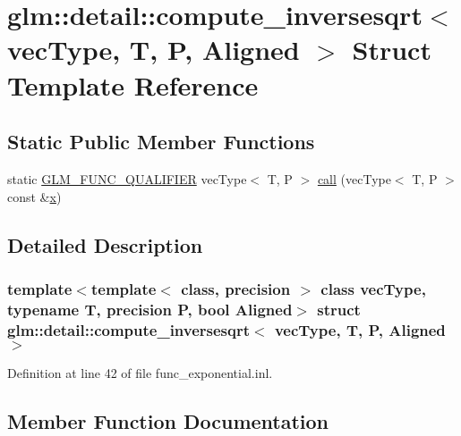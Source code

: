 \hypertarget{structglm_1_1detail_1_1compute__inversesqrt}{}\section{glm\+::detail\+::compute\+\_\+inversesqrt$<$ vec\+Type, T, P, Aligned $>$ Struct Template Reference}
\label{structglm_1_1detail_1_1compute__inversesqrt}
\subsection*{Static Public Member Functions}
\begin{DoxyCompactItemize}
\item 
static \mbox{\hyperlink{setup_8hpp_a33fdea6f91c5f834105f7415e2a64407}{G\+L\+M\+\_\+\+F\+U\+N\+C\+\_\+\+Q\+U\+A\+L\+I\+F\+I\+ER}} vec\+Type$<$ T, P $>$ \mbox{\hyperlink{structglm_1_1detail_1_1compute__inversesqrt_ae406dd2e5f5cd17e99ad85e21ae0ae5a}{call}} (vec\+Type$<$ T, P $>$ const \&\mbox{\hyperlink{glad_8h_a92d0386e5c19fb81ea88c9f99644ab1d}{x}})
\end{DoxyCompactItemize}


\subsection{Detailed Description}
\subsubsection*{template$<$template$<$ class, precision $>$ class vec\+Type, typename T, precision P, bool Aligned$>$\newline
struct glm\+::detail\+::compute\+\_\+inversesqrt$<$ vec\+Type, T, P, Aligned $>$}



Definition at line 42 of file func\+\_\+exponential.\+inl.



\subsection{Member Function Documentation}
\mbox{\label{structglm_1_1detail_1_1compute__inversesqrt_ae406dd2e5f5cd17e99ad85e21ae0ae5a}} 
